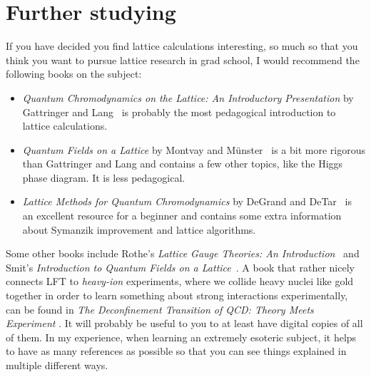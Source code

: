 \section{Further studying}

If you have decided you
find lattice calculations interesting, so much so that you think you want to
pursue lattice research in grad school, I would recommend the following books on
the subject:
\begin{itemize}
\item {\it Quantum Chromodynamics on the Lattice: An Introductory Presentation}
by Gattringer and Lang~\cite{gattringer_quantum_2010} is probably the most pedagogical 
introduction to lattice calculations.
\item {\it Quantum Fields on a Lattice} by Montvay and 
M\"unster~\cite{montvay_quantum_1994} is a bit more
rigorous than Gattringer and Lang and contains a few other topics, like the
Higgs phase diagram. It is less pedagogical.
\item {\it Lattice Methods for Quantum Chromodynamics} by DeGrand and 
DeTar~\cite{degrand_lattice_2006} is
an excellent resource for a beginner and contains some extra information about
Symanzik improvement and lattice algorithms.
\end{itemize}
Some other books include Rothe's {\it Lattice Gauge Theories: An 
Introduction}~\cite{rothe_lattice_2005} and Smit's {\it Introduction to Quantum 
Fields on a Lattice}~\cite{smit_introduction_2002}. A book that rather
nicely connects LFT to {\it heavy-ion} experiments,
where we collide heavy nuclei like gold together in order to learn something
about strong interactions experimentally, can be found
in {\it The Deconfinement Transition of QCD: Theory Meets Experiment}
\cite{ratti_deconfinement_2021}. It will probably
be useful to you to at least have digital copies of all of them. In my
experience, when learning an extremely esoteric subject, it helps to have as
many references as possible so that you can see things explained in multiple
different ways.

